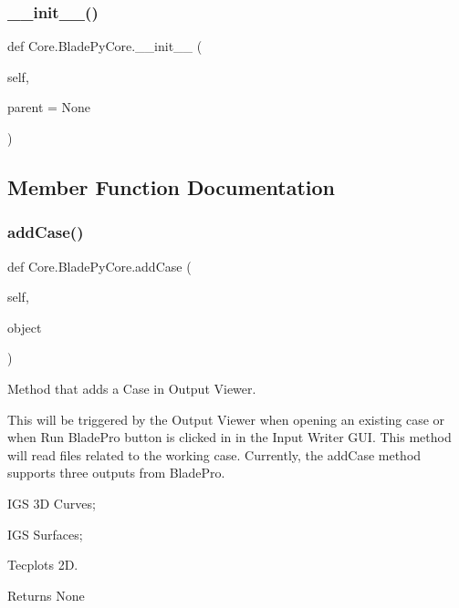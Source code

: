\subsubsection{\texorpdfstring{\+\_\+\+\_\+init\+\_\+\+\_\+()}{\_\_init\_\_()}}
{\footnotesize\ttfamily def Core.\+Blade\+Py\+Core.\+\_\+\+\_\+init\+\_\+\+\_\+ (\begin{DoxyParamCaption}\item[{}]{self,  }\item[{}]{parent = {\ttfamily None} }\end{DoxyParamCaption})}



\subsection{Member Function Documentation}
\hypertarget{a00078_a1a62f9b5b8f5929bdb6f0a8c27049d9e}{}\label{a00078_a1a62f9b5b8f5929bdb6f0a8c27049d9e} 
\subsubsection{\texorpdfstring{add\+Case()}{addCase()}}
{\footnotesize\ttfamily def Core.\+Blade\+Py\+Core.\+add\+Case (\begin{DoxyParamCaption}\item[{}]{self,  }\item[{}]{object }\end{DoxyParamCaption})}



Method that adds a Case in Output Viewer. 

This will be triggered by the Output Viewer when opening an existing case or when Run Blade\+Pro button is clicked in in the Input Writer G\+UI. This method will read files related to the working case. Currently, the add\+Case method supports three outputs from Blade\+Pro.

\begin{DoxyItemize}
\item I\+GS 3D Curves; \item I\+GS Surfaces; \item Tecplots 2D.\end{DoxyItemize}
\begin{DoxyReturn}{Returns}
None 
\end{DoxyReturn}
\hypertarget{a00078_a305ea5ff4997029c7a54a4550a23eba8}{}\label{a00078_a305ea5ff4997029c7a54a4550a23eba8} 
